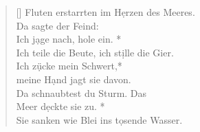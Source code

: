 \begin{verse}[\versewidth]
Fluten erstarrten im H\d erzen des Meeres.\\
\vin Da sagte der Feind: \\ \vin Ich j\d age nach, hole ein. *\\
\vin Ich teile die Beute, ich st\d ille die Gier. \\
 Ich z\d ücke mein Schwert,*\\
 meine H\d and jagt sie davon.\\
\vin Da schnaubtest du Sturm. Das \\ \vin Meer d\d eckte sie zu. *\\
\vin Sie sanken wie Blei ins t\d osende Wasser.\\
\end{verse}

\vspace{0.3cm}

\begin{center}
\end{center}

\vspace{0.3cm}

